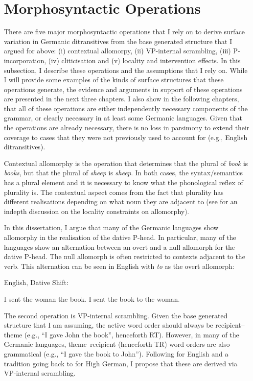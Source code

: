 \section{Morphosyntactic Operations}
There are five major morphosyntactic operations that I rely on to derive surface variation in Germanic ditransitives from the base generated structure that I argued for above: (i) contextual allomorpy, (ii) VP-internal scrambling, (iii) P-incorporation, (iv) cliticisation and (v) locality and intervention effects. In this subsection, I describe these operations and the assumptions that I rely on. While I will provide some examples of the kinds of surface structures that these operations generate, the evidence and arguments in support of these operations are presented in the next three chapters. I also show in the following chapters, that all of these operations are either independently necessary components of the grammar, or clearly necessary in at least some Germanic languages. Given that the operations are already necessary, there is no loss in parsimony to extend their coverage to cases that they were not previously used to account for (e.g., English ditransitives).

Contextual allomorphy is the operation that determines that the plural of \textit{book} is \textit{books}, but that the plural of \textit{sheep} is \textit{sheep}. In both cases, the syntax/semantics has a plural element and it is necessary to know what the phonological reflex of plurality is. The contextual aspect comes from the fact that plurality has different realisations depending on what noun they are adjacent to (see \citealt{Embick.2010} for an indepth discussion on the locality constraints on allomorphy). 

In this dissertation, I argue that many of the Germanic languages show allomorphy in the realisation of the dative P-head. In particular, many of the languages show an alternation between an overt and a null allomorph for the dative P-head. The null allomorph is often restricted to contexts adjacent to the verb. This alternation can be seen in English with \textit{to} as the overt allomorph:
\begin{exe}
	\ex English, Dative Shift: \label{ex:dat-shift}
	\begin{xlist}
		\ex \label{ex:english-1} I sent the woman the book.
		\ex \label{ex:english-2} I sent the book to the woman.
	\end{xlist}
\end{exe}

The second operation is VP-internal scrambling. Given the base generated structure that I am assuming, the active word order should always be recipient--theme (e.g., ``I gave John the book'', henceforth RT). However, in many of the Germanic languages, theme--recipient (henceforth TR) word orders are also grammatical (e.g., ``I gave the book to John''). Following \cite{Takano.1998} for English and a tradition going back to \cite{Lenerz.1977} for High German, I propose that these are derived via VP-internal scrambling.


